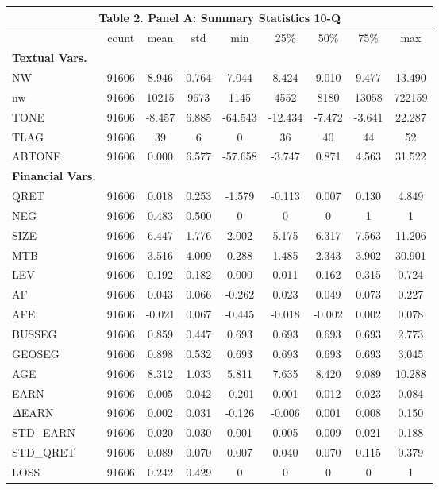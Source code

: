 \begin{table}[htbp] \label{T2PA}
  \centering
    \begin{tabular}{lcccccccc}
    \multicolumn{9}{c}{\textbf{Table 2. Panel A: Summary Statistics 10-Q}} \\
    \midrule
    \midrule
      & count & mean & std & min & 25\% & 50\% & 75\% & max \\
    \midrule
    \textbf{Textual Vars.} &   &   &   &   &   &   &   &  \\
    NW & 91606 & 8.946 & 0.764 & 7.044 & 8.424 & 9.010 & 9.477 & 13.490 \\
    nw & 91606 & 10215 & 9673 & 1145 & 4552 & 8180 & 13058 & 722159 \\
    TONE & 91606 & -8.457 & 6.885 & -64.543 & -12.434 & -7.472 & -3.641 & 22.287 \\
    TLAG & 91606 & 39 & 6 & 0 & 36 & 40 & 44 & 52 \\
    ABTONE & 91606 & 0.000 & 6.577 & -57.658 & -3.747 & 0.871 & 4.563 & 31.522 \\
    \textbf{Financial Vars.} &   &   &   &   &   &   &   &  \\
    QRET & 91606 & 0.018 & 0.253 & -1.579 & -0.113 & 0.007 & 0.130 & 4.849 \\
    NEG & 91606 & 0.483 & 0.500 & 0 & 0 & 0 & 1 & 1 \\
    SIZE & 91606 & 6.447 & 1.776 & 2.002 & 5.175 & 6.317 & 7.563 & 11.206 \\
    MTB & 91606 & 3.516 & 4.009 & 0.288 & 1.485 & 2.343 & 3.902 & 30.901 \\
    LEV & 91606 & 0.192 & 0.182 & 0.000 & 0.011 & 0.162 & 0.315 & 0.724 \\
    AF & 91606 & 0.043 & 0.066 & -0.262 & 0.023 & 0.049 & 0.073 & 0.227 \\
    AFE & 91606 & -0.021 & 0.067 & -0.445 & -0.018 & -0.002 & 0.002 & 0.078 \\
    BUSSEG & 91606 & 0.859 & 0.447 & 0.693 & 0.693 & 0.693 & 0.693 & 2.773 \\
    GEOSEG & 91606 & 0.898 & 0.532 & 0.693 & 0.693 & 0.693 & 0.693 & 3.045 \\
    AGE & 91606 & 8.312 & 1.033 & 5.811 & 7.635 & 8.420 & 9.089 & 10.288 \\
    EARN & 91606 & 0.005 & 0.042 & -0.201 & 0.001 & 0.012 & 0.023 & 0.084 \\
    $\Delta$EARN & 91606 & 0.002 & 0.031 & -0.126 & -0.006 & 0.001 & 0.008 & 0.150 \\
    STD\_EARN & 91606 & 0.020 & 0.030 & 0.001 & 0.005 & 0.009 & 0.021 & 0.188 \\
    STD\_QRET & 91606 & 0.089 & 0.070 & 0.007 & 0.040 & 0.070 & 0.115 & 0.379 \\
    LOSS & 91606 & 0.242 & 0.429 & 0 & 0 & 0 & 0 & 1 \\
    \bottomrule
    \bottomrule
    \end{tabular}%
\end{table}%
